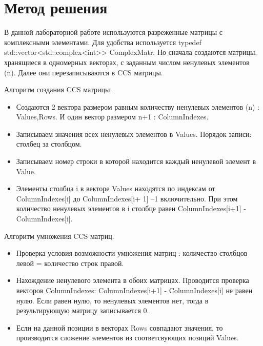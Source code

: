 \documentclass{report}
\begin{document}
\section*{Метод решения}
В данной лабораторной работе используются разреженные матрицы с комплексными элементами. Для удобства используется typedef std::vector<std::complex<int>> ComplexMatr. Но сначала создаются матрицы, хранящиеся в одномерных векторах, с заданным числом ненулевых элементов (n). Далее они перезаписываются в CCS матрицы.
\par Алгоритм создания CCS матрицы.
\begin{itemize}
\item Создаются 2 вектора размером равным количеству ненулевых элементов (n) : Values,Rows. И один вектор размером n+1 : ColumnIndexes.
\item Записываем значения всех ненулевых элементов в Values. Порядок записи: столбец за столбцом.
\item Записываем номер строки в которой находится каждый ненулевой элемент в Value.
\item Элементы  столбца i в векторе Values находятся  по  индексам  от ColumnIndexes[i] до ColumnIndexes[i+ 1] –1 включительно. При этом количество ненулевых элементов в i столбце равен ColumnIndexes[i+1] - ColumnIndexes[i].
\end{itemize}
\par Алгоритм умножения CCS матриц.
\begin{itemize}
\item Проверка условия возможности умножения матриц : количество столбцов левой = количество строк правой.
\item Нахождение ненулевого элемента в обоих матрицах. Проводится проверка векторов ColumnIndexes: ColumnIndexes[i+1] - ColumnIndexes[i] не равен нулю. Если равен нулю, то ненулевых элементов нет, тогда в результирующую матрицу записывается 0.
\item Если на данной позиции в векторах Rows совпадают значения, то производится сложение элементов из соответсвующих позиций Values.
\end{itemize}
\newpage

\end{document}
